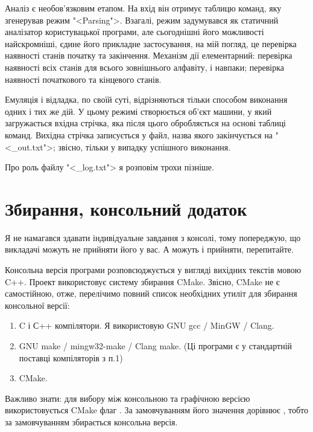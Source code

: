 \documentclass[oneside,final,14pt]{extreport}
\begin{document}
Аналіз є необов'язковим етапом. На вхід він отримує таблицю команд, яку згенерував режим "<Parsing">. Взагалі, режим задумувався як статичний аналізатор користувацької програми, але сьогоднішні його можливості найскромніші, єдине його прикладне застосування, на мій погляд, це перевірка наявності станів початку та закінчення. Механізм дії елементарний: перевірка наявності всіх станів для всього зовнішнього алфавіту, і навпаки; перевірка наявності початкового та кінцевого станів.

Емуляція і відладка, по своїй суті, відрізняються тільки способом виконання одних і тих же дій. У цьому режимі створюється об'єкт машини, у який загружається вхідна стрічка, яка після цього обробляється на основі таблиці команд. Вихідна стрічка записується у файл, назва якого закінчується на "<\_out.txt">; звісно, тільки у випадку успішного виконання.

Про роль файлу "<\_log.txt"> я розповім трохи пізніше.

\chapter{Збирання, консольний додаток}
Я не намагався здавати індивідуальне завдання з консолі, тому попереджую,
\marginpar[]{\Huge \bfseries !} 
 що викладачі можуть не прийняти його у вас. А можуть і прийняти, перепитайте.
 
\vspace{0.4 cm}
 
 Консольна версія програми розповсюджується у вигляді вихідних текстів мовою C++. Проект використовує систему збирання CMake.
 Звісно, CMake не є самостійною, отже, перелічимо повний список необхідних утиліт для збирання консольної версії:
  
 \begin{enumerate} 
  \item C і С++ компілятори. Я використовую GNU gcc / MinGW / Clang.
  \item  GNU make / mingw32-make / Clang make. (Ці програми є у стандартній поставці компіляторів з п.1)
  \item CMake.
\end{enumerate}
  
Важливо знати: для вибору між консольною та графічною версією використовується CMake флаг . За замовчуванням його значення дорівнює , тобто за замовчуванням збирається консольна версія.
\end{document}
